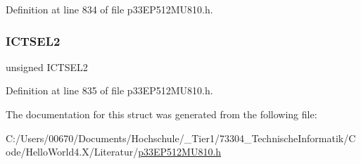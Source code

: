 Definition at line 834 of file p33\+E\+P512\+M\+U810.\+h.

\mbox{\label{structtag_i_c6_c_o_n1_b_i_t_s_a47d80892d449e6edbd5ba2ba9ff06deb}} 
\subsubsection{\texorpdfstring{I\+C\+T\+S\+E\+L2}{ICTSEL2}}
{\footnotesize\ttfamily unsigned I\+C\+T\+S\+E\+L2}



Definition at line 835 of file p33\+E\+P512\+M\+U810.\+h.



The documentation for this struct was generated from the following file\+:\begin{DoxyCompactItemize}
\item 
C\+:/\+Users/00670/\+Documents/\+Hochschule/\+\_\+\+Tier1/73304\+\_\+\+Technische\+Informatik/\+Code/\+Hello\+World4.\+X/\+Literatur/\hyperlink{p33_e_p512_m_u810_8h}{p33\+E\+P512\+M\+U810.\+h}\end{DoxyCompactItemize}

